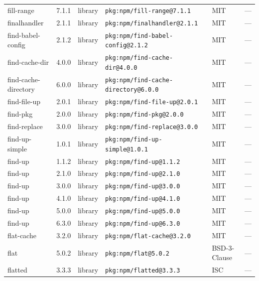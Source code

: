 \documentclass[11pt,a4paper]{article}
\begin{document}
\begin{longtable}{|p{4cm}|p{2cm}|p{1.6cm}|p{5cm}|p{1.5cm}|p{3.5cm}|}
\raggedright fill-range & 7.1.1 & library & \small\texttt{pkg:npm/fill-range@7.1.1} & MIT & \small — \\
\raggedright finalhandler & 2.1.1 & library & \small\texttt{pkg:npm/finalhandler@2.1.1} & MIT & \small — \\
\raggedright find-babel-config & 2.1.2 & library & \small\texttt{pkg:npm/find-babel-config@2.1.2} & MIT & \small — \\
\raggedright find-cache-dir & 4.0.0 & library & \small\texttt{pkg:npm/find-cache-dir@4.0.0} & MIT & \small — \\
\raggedright find-cache-directory & 6.0.0 & library & \small\texttt{pkg:npm/find-cache-directory@6.0.0} & MIT & \small — \\
\raggedright find-file-up & 2.0.1 & library & \small\texttt{pkg:npm/find-file-up@2.0.1} & MIT & \small — \\
\raggedright find-pkg & 2.0.0 & library & \small\texttt{pkg:npm/find-pkg@2.0.0} & MIT & \small — \\
\raggedright find-replace & 3.0.0 & library & \small\texttt{pkg:npm/find-replace@3.0.0} & MIT & \small — \\
\raggedright find-up-simple & 1.0.1 & library & \small\texttt{pkg:npm/find-up-simple@1.0.1} & MIT & \small — \\
\raggedright find-up & 1.1.2 & library & \small\texttt{pkg:npm/find-up@1.1.2} & MIT & \small — \\
\raggedright find-up & 2.1.0 & library & \small\texttt{pkg:npm/find-up@2.1.0} & MIT & \small — \\
\raggedright find-up & 3.0.0 & library & \small\texttt{pkg:npm/find-up@3.0.0} & MIT & \small — \\
\raggedright find-up & 4.1.0 & library & \small\texttt{pkg:npm/find-up@4.1.0} & MIT & \small — \\
\raggedright find-up & 5.0.0 & library & \small\texttt{pkg:npm/find-up@5.0.0} & MIT & \small — \\
\raggedright find-up & 6.3.0 & library & \small\texttt{pkg:npm/find-up@6.3.0} & MIT & \small — \\
\raggedright flat-cache & 3.2.0 & library & \small\texttt{pkg:npm/flat-cache@3.2.0} & MIT & \small — \\
\raggedright flat & 5.0.2 & library & \small\texttt{pkg:npm/flat@5.0.2} & BSD-3-Clause & \small — \\
\raggedright flatted & 3.3.3 & library & \small\texttt{pkg:npm/flatted@3.3.3} & ISC & \small — \\

\end{longtable}
\end{document}
